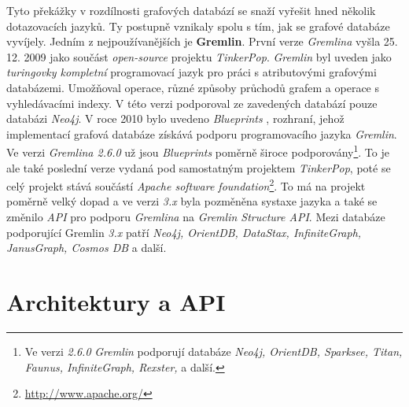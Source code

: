 {%
Tyto překážky v rozdílnosti grafových databází se snaží vyřešit hned několik dotazovacích jazyků. Ty postupně vznikaly spolu s tím, jak se grafové databáze vyvíjely. Jedním z nejpoužívanějších je \textbf{Gremlin}. První verze \textit{Gremlina} vyšla 25. 12. 2009 \cite{Gremlin09} jako součást \textit{open-source} projektu \textit{TinkerPop}. \textit{Gremlin} byl uveden jako \textit{turingovky kompletní} programovací jazyk pro práci s atributovými grafovými databázemi. Umožňoval \textit{} operace, různé způsoby průchodů grafem a operace s vyhledávacími indexy. V této verzi podporoval ze zavedených databází pouze databázi \textit{Neo4j}. 
V roce 2010 bylo uvedeno \textit{Blueprints} \cite{Blueprints10}, rozhraní, jehož implementací grafová databáze získává podporu programovacího jazyka \textit{Gremlin}. 
Ve verzi \textit{Gremlina 2.6.0} \cite{Gremlin14} už jsou \textit{Blueprints} poměrně široce podporovány\footnote{Ve verzi \textit{2.6.0} \textit{Gremlin} podporují databáze \textit{Neo4j, OrientDB, Sparksee, Titan, Faunus, InfiniteGraph, Rexster,} a další.}. To je ale také poslední verze vydaná pod samostatným projektem \textit{TinkerPop}, poté se celý projekt stává součástí \textit{Apache software foundation}\footnote{\url{http://www.apache.org/}}. To má na projekt poměrně velký dopad a ve verzi \textit{3.x} \cite{Gremlin17} byla pozměněna systaxe jazyka a také se změnilo \textit{API} pro podporu \textit{Gremlina} na \textit{Gremlin Structure API}. Mezi databáze podporující Gremlin \textit{3.x} patří \textit{Neo4j, OrientDB, DataStax, InfiniteGraph, JanusGraph, Cosmos DB} a další.





 



\section{Architektury a API} %



}
